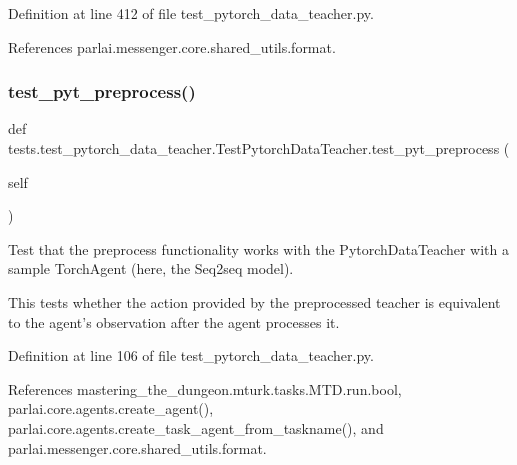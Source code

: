 Definition at line 412 of file test\+\_\+pytorch\+\_\+data\+\_\+teacher.\+py.



References parlai.\+messenger.\+core.\+shared\+\_\+utils.\+format.

\mbox{\label{classtests_1_1test__pytorch__data__teacher_1_1TestPytorchDataTeacher_ad9d9065300215a4afeb0589192b5ba05}} 
\subsubsection{\texorpdfstring{test\+\_\+pyt\+\_\+preprocess()}{test\_pyt\_preprocess()}}
{\footnotesize\ttfamily def tests.\+test\+\_\+pytorch\+\_\+data\+\_\+teacher.\+Test\+Pytorch\+Data\+Teacher.\+test\+\_\+pyt\+\_\+preprocess (\begin{DoxyParamCaption}\item[{}]{self }\end{DoxyParamCaption})}

\begin{DoxyVerb}Test that the preprocess functionality works with the PytorchDataTeacher
with a sample TorchAgent (here, the Seq2seq model).

This tests whether the action provided by the preprocessed teacher
is equivalent to the agent's observation after the agent processes it.
\end{DoxyVerb}
 

Definition at line 106 of file test\+\_\+pytorch\+\_\+data\+\_\+teacher.\+py.



References mastering\+\_\+the\+\_\+dungeon.\+mturk.\+tasks.\+M\+T\+D.\+run.\+bool, parlai.\+core.\+agents.\+create\+\_\+agent(), parlai.\+core.\+agents.\+create\+\_\+task\+\_\+agent\+\_\+from\+\_\+taskname(), and parlai.\+messenger.\+core.\+shared\+\_\+utils.\+format.

